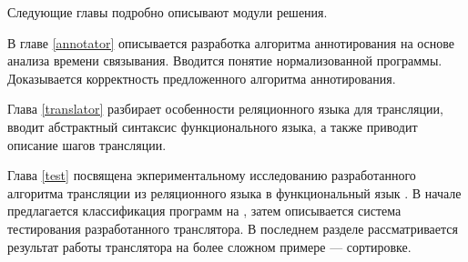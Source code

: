 Следующие главы подробно описывают модули решения.

В главе \ref{annotator} описывается разработка алгоритма аннотирования на основе анализа времени связывания.
Вводится понятие нормализованной программы.
Доказывается корректность предложенного алгоритма аннотирования.

Глава \ref{translator} разбирает особенности реляционного языка \miniKanren{} для трансляции, вводит абстрактный синтаксис функционального языка, а также приводит описание шагов трансляции.

Глава \ref{test} посвящена экпериментальному исследованию разработанного алгоритма трансляции из реляционного языка \miniKanren{} в функциональный язык \haskell{}.
В начале предлагается классификация программ на \miniKanren{}, затем описывается система тестирования разработанного транслятора.
В последнем разделе рассматривается результат работы транслятора на более сложном примере --- сортировке.
